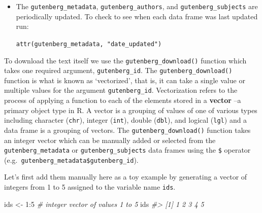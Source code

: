 \documentclass[
]{article}
\newenvironment{Shaded}{\begin{snugshade}}{\end{snugshade}}
\newcommand{\CommentTok}[1]{\textcolor[rgb]{0.56,0.35,0.01}{\textit{#1}}}
\newcommand{\DecValTok}[1]{\textcolor[rgb]{0.00,0.00,0.81}{#1}}
\newcommand{\FunctionTok}[1]{\textcolor[rgb]{0.00,0.00,0.00}{#1}}
\newcommand{\NormalTok}[1]{#1}
\newcommand{\OtherTok}[1]{\textcolor[rgb]{0.56,0.35,0.01}{#1}}
\newcommand{\SpecialCharTok}[1]{\textcolor[rgb]{0.00,0.00,0.00}{#1}}
\newenvironment{rmdblock}[1]
  {\begin{shaded*}
  \begin{itemize}
  \renewcommand{\labelitemi}{
    \raisebox{-.5\height}[0pt][0pt]{
      {\setkeys{Gin}{width=2em,keepaspectratio}\texttt{[image: assets/images/\#1]}}
    }
  }
  \item
  }
  {
  \end{itemize}
  \end{shaded*}
  }
\newenvironment{rmdtip}
  {\begin{rmdblock}{tip}}
  {\end{rmdblock}}
\begin{document}
\begin{Shaded}
\end{Shaded}

\begin{rmdtip}
The \texttt{gutenberg\_metadata}, \texttt{gutenberg\_authors}, and \texttt{gutenberg\_subjects} are periodically updated. To check to see when each data frame was last updated run:

\texttt{attr(gutenberg\_metadata,\ "date\_updated")}
\end{rmdtip}

To download the text itself we use the \texttt{gutenberg\_download()} function which takes one required argument, \texttt{gutenberg\_id}. The \texttt{gutenberg\_download()} function is what is known as `vectorized', that is, it can take a single value or multiple values for the argument \texttt{gutenberg\_id}. Vectorization refers to the process of applying a function to each of the elements stored in a \textbf{vector} --a primary object type in R. A vector is a grouping of values of one of various types including character (\texttt{chr}), integer (\texttt{int}), double (\texttt{dbl}), and logical (\texttt{lgl}) and a data frame is a grouping of vectors. The \texttt{gutenberg\_download()} function takes an integer vector which can be manually added or selected from the \texttt{gutenberg\_metadata} or \texttt{gutenberg\_subjects} data frames using the \texttt{\$} operator (e.g.~\texttt{gutenberg\_metadata\$gutenberg\_id}).

Let's first add them manually here as a toy example by generating a vector of integers from 1 to 5 assigned to the variable name \texttt{ids}.

\begin{Shaded}
\begin{Highlighting}[]
\NormalTok{ids }\OtherTok{\textless{}{-}} \DecValTok{1}\SpecialCharTok{:}\DecValTok{5}  \CommentTok{\# integer vector of values 1 to 5}
\NormalTok{ids}
\CommentTok{\#\textgreater{} [1] 1 2 3 4 5}
\end{Highlighting}
\end{Shaded}
\end{document}
